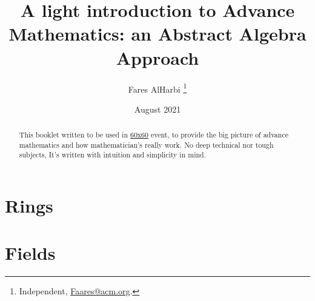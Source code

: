 \documentclass{article}
\title{A light introduction to Advance Mathematics: an Abstract Algebra Approach}
\author{Fares AlHarbi \thanks{Independent, \href{mailto:faares@acm.org}{Faares@acm.org}.}}
\date{August 2021}
\begin{document}
\maketitle
\begin{abstract}
    This booklet written to be used in \hyperlink{https://salla.sa/durba/RYePmz}{60x60} event,
    to provide the big picture of advance mathematics and how mathematician's really work.
    No deep technical nor tough subjects, It's written with intuition and simplicity in mind. 
\end{abstract}

\clearpage
\tableofcontents 




\clearpage


\clearpage

\clearpage

\clearpage

\clearpage

\clearpage

\clearpage
\section{Rings}
\clearpage
\section{Fields}

\clearpage
\printbibliography[heading=bibintoc]
\end{document}
